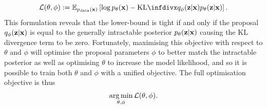 \begin{equation}
    \gL(\theta, \phi) := \EX_{\pdata(\rvx)} \left[ \log p_\theta(\rvx) - \kl{q_\phi(\rvz|\rvx)}{p_\theta(\rvz|\rvx)} \right].
\end{equation}
This formulation reveals that the lower-bound is tight if and only if the proposal $q_\phi({\mathbf{z}}|{\mathbf{x}})$ is equal to the generally intractable posterior $p_\theta({\mathbf{z}}|{\mathbf{x}})$ causing the KL divergence term to be zero. Fortunately, maximising this objective with respect to $\theta$ and $\phi$ will optimise the proposal parameters $\phi$ to better match the intractable posterior as well as optimising $\theta$ to increase the model likelihood, and so it is possible to train both $\theta$ and $\phi$ with a unified objective. The full optimisation objective is thus
\begin{align}
    \operatorname*{arg\,min}_{\theta,\phi} {\mathcal{L}}(\theta, \phi).
\end{align}

